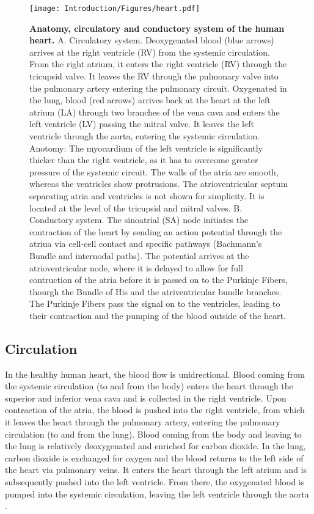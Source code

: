 \begin{figure}[hbtp]
	\centering
	\texttt{[image: Introduction/Figures/heart.pdf]}
	\caption[\textbf{Anatomy, circulatory and conductory system of the human heart. }]{\textbf{Anatomy, circulatory and conductory system of the human heart. }A. Circulatory system. Deoxygenated blood (blue arrows) arrives at the right ventricle (RV) from the systemic circulation. From the right atrium, it enters the right ventricle (RV) through the tricupsid valve. It leaves the RV through the pulmonary valve into the pulmonary artery entering the pulmonary circuit. Oxygenated in the lung, blood (red arrows) arrives back at the heart at the left atrium (LA) through two branches of the vena cava and enters the left ventricle (LV) passing the mitral valve. It leaves the left ventricle through the aorta, entering the systemic circulation. Anotomy: The myocardium of the left ventricle is significantly thicker than the right ventricle, as it has to overcome greater pressure of the systemic circuit. The walls of the atria are smooth, whereas the ventricles show protrusions. The atrioventricular septum separating atria and ventricles is not shown for simplicity. It is located at the level of the tricupsid and mitral valves. B. Conductory system. The sinoatrial (SA) node initiates the contraction of the heart by sending an action potential through the atriua via cell-cell contact and specific pathways (Bachmann's Bundle and internodal paths). The potential arrives at the atrioventricular node, where it is delayed to allow for full contruction of the atria before it is passed on to the Purkinje Fibers, thourgh the Bundle of His and the  atriventricular bundle branches. The Purkinje Fibers pass the signal on to the ventricles, leading to their contraction and the pumping of the blood outside of the heart. } 
	 	\label{fig:heart}
\end{figure}

\subsection{Circulation}
In the healthy human heart, the blood flow is unidrectional.  Blood coming from the systemic circulation (to and from the body) enters the heart through the superior and inferior vena cava and is collected in the right ventricle. Upon contraction of the atria, the blood is pushed into the right ventricle, from which it leaves the heart through the pulmonary artery, entering the pulmonary circulation (to and from the lung). Blood coming from the body and leaving to the lung is relatively deoxygenated and enriched for carbon dioxide. In the lung, carbon dioxide is exchanged for oxygen and the blood returns to the left side of the heart via pulmonary veins. It enters the heart through the left atrium and is subsequently pushed into the left ventricle. From there, the oxygenated blood is pumped into the systemic circulation, leaving the left ventricle through the aorta \citep{Betts2013}. 

